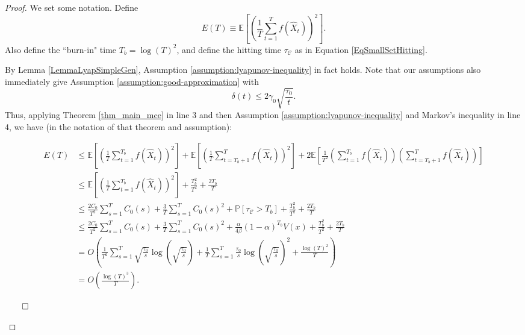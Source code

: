 \begin{proof}
We set some notation. Define
\begin{equation}
    E(T) \equiv \mathbb{E}\left[ \left( \frac{1}{T} \sum_{t=1}^{T} f(\hat{X}_t) \right)^2 \right]. 
\end{equation}
Also define the ``burn-in" time $T_{b} = \log(T)^{2}$, and define the hitting time $\tau_{\mathcal{C}}$ as in Equation \eqref{EqSmallSetHitting}.


By Lemma \ref{LemmaLyapSimpleGen}, Assumption \ref{assumption:lyapunov-inequality} in fact holds. Note that our assumptions also immediately give Assumption \ref{assumption:good-approximation} with
\[
\delta(t) \leq 2 \gamma_{0} \sqrt{\frac{\tau_{0}}{t}}.
\]
Thus, applying Theorem \ref{thm_main_mce} in line 3 and then Assumption  \ref{assumption:lyapunov-inequality} and Markov's inequality in line 4, we have (in the notation of that theorem and assumption): 

\begin{align*}
E(T) &\leq \mathbb{E}\left[ \left( \frac{1}{T} \sum_{t=1}^{T_{b}} f(\hat{X}_t) \right)^2 \right] + \mathbb{E}\left[ \left( \frac{1}{T} \sum_{t=T_{b}+1}^{T} f(\hat{X}_t) \right)^2 \right] + 2 \mathbb{E}\left[ \frac{1}{T^{2}} \left( \sum_{t=1}^{T_{b}} f(\hat{X}_t) \right) \left( \sum_{t=T_{b}+1}^{T} f(\hat{X}_t) \right) \right]\\
&\leq \mathbb{E}\left[ \left( \frac{1}{T} \sum_{t=1}^{T_{b}} f(\hat{X}_t) \right)^2 \right] + \frac{T_{b}^{2}}{T^{2}} + \frac{2T_{b}}{T} \\
&\leq \frac{2C_{0}}{T^{2}}\sum_{s=1}^{T} C_{0}(s) + \frac{3}{T} \sum_{s=1}^{T} C_{0}(s)^{2} + \mathbb{P}[\tau_{\mathcal{C}} > T_{b}] + \frac{T_{b}^{2}}{T^{2}} + \frac{2T_{b}}{T} \\
&\leq \frac{2C_{0}}{T^{2}}\sum_{s=1}^{T} C_{0}(s) + \frac{3}{T} \sum_{s=1}^{T} C_{0}(s)^{2} + \frac{\alpha}{4 \beta} (1-\alpha)^{T_{b}} V(x) + \frac{T_{b}^{2}}{T^{2}} + \frac{2T_{b}}{T} \\
&=O\left ( \frac{1}{T^{2}} \sum_{s=1}^{T} \sqrt{\frac{\tau_{0}}{s}} \log\left (\sqrt{\frac{\tau_{0}}{s}} \right )  + \frac{1}{T} \sum_{s=1}^{T}\frac{\tau_{0}}{s} \log\left (\sqrt{\frac{\tau_{0}}{s}}\right )^{2} + \frac{\log(T)^{2}}{T} \right )\\
&= O \left ( \frac{\log(T)^{3}}{T} \right ).
\end{align*}
\begin{flushright}$\qed$\end{flushright}
\end{proof}

